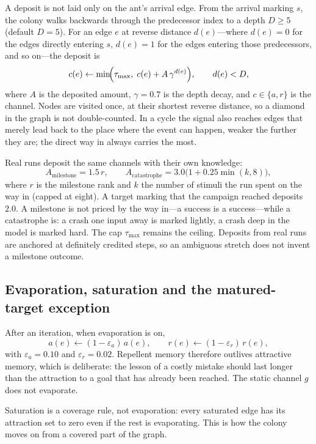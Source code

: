 \documentclass[11pt,a4paper]{article}
\newcommand{\Tau}{\tau_{\max}}
\begin{document}
A deposit is not laid only on the ant's arrival edge.  From the arrival
marking $s$, the colony walks backwards through the predecessor index to a depth
$D\ge5$ (default $D=5$).  For an edge $e$ at reverse distance $d(e)$---where
$d(e)=0$ for the edges directly entering $s$, $d(e)=1$ for the edges entering
those predecessors, and so on---the deposit is
\[
  c(e)\leftarrow
  \min\!\Bigl(\Tau,\; c(e)+A\,\gamma^{d(e)}\Bigr),
  \qquad d(e)<D,
  \label{eq:backprop}
\]
where $A$ is the deposited amount, $\gamma=0.7$ is the depth decay, and
$c\in\{a,r\}$ is the channel.  Nodes are visited once, at their shortest
reverse distance, so a diamond in the graph is not double-counted.  In a
cycle the signal also reaches edges that merely lead back to the place where
the event can happen, weaker the further they are; the direct way in always
carries the most.

Real runs deposit the same channels with their own knowledge:
\[
  A_{\mathrm{milestone}}=1.5\,r,\qquad
  A_{\mathrm{catastrophe}}=3.0\bigl(1+0.25\min(k,8)\bigr),
\]
where $r$ is the milestone rank and $k$ the number of stimuli the run spent
on the way in (capped at eight).  A target marking that the campaign reached
deposits $2.0$.  A milestone is not priced by the way in---a success is a
success---while a catastrophe is: a crash one input away is marked lightly, a
crash deep in the model is marked hard.  The cap $\Tau$ remains the ceiling.
Deposits from real runs are anchored at definitely credited steps, so an
ambiguous stretch does not invent a milestone outcome.

\subsection{Evaporation, saturation and the matured-target exception}

After an iteration, when evaporation is on,
\[
  a(e)\leftarrow(1-\varepsilon_a)\,a(e),
  \qquad
  r(e)\leftarrow(1-\varepsilon_r)\,r(e),
  \label{eq:evaporation}
\]
with $\varepsilon_a=0.10$ and $\varepsilon_r=0.02$.  Repellent memory
therefore outlives attractive memory, which is deliberate: the lesson of a
costly mistake should last longer than the attraction to a goal that has
already been reached.  The static channel $g$ does not evaporate.

Saturation is a coverage rule, not evaporation: every saturated edge has its
attraction set to zero even if the rest is evaporating.  This is how the
colony moves on from a covered part of the graph.
\end{document}
